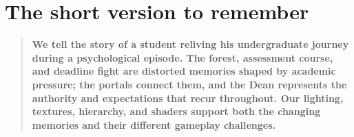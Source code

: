 \documentclass[11pt,a4paper]{article}
\begin{document}
\section{The short version to remember}

\begin{quote}\large\bfseries\color{ink}
We tell the story of a student reliving his undergraduate journey during a psychological episode. The forest, assessment course, and deadline fight are distorted memories shaped by academic pressure; the portals connect them, and the Dean represents the authority and expectations that recur throughout. Our lighting, textures, hierarchy, and shaders support both the changing memories and their different gameplay challenges.
\end{quote}

\vfill
\noindent\small\color{gray}{Prepared from the current project source and the CGV beta brief.}
\end{document}
